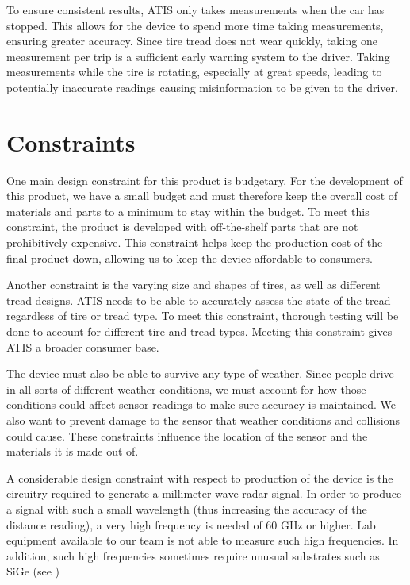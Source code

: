 \documentclass[11pt]{IEEEtran}
\begin{document}
			To ensure consistent results, ATIS only takes measurements when the car has stopped. This allows for the device to spend more time taking measurements, ensuring greater accuracy. Since tire tread does not wear quickly, taking one measurement per trip is a sufficient early warning system to the driver. Taking measurements while the tire is rotating, especially at great speeds, leading to potentially inaccurate readings causing misinformation to be given to the driver.


	\section{Constraints}
		One main design constraint for this product is budgetary. For the development of this product, we have a small budget and must therefore keep the overall cost of materials and parts to a minimum to stay within the budget. To meet this constraint, the product is developed with off-the-shelf parts that are not prohibitively expensive. This constraint helps keep the production cost of the final product down, allowing us to keep the device affordable to consumers. 

		Another constraint is the varying size and shapes of tires, as well as different tread designs. ATIS needs to be able to accurately assess the state of the tread regardless of tire or tread type. To meet this constraint, thorough testing will be done to account for different tire and tread types. Meeting this constraint gives ATIS a broader consumer base.

		The device must also be able to survive any type of weather. Since people drive in all sorts of different weather conditions, we must account for how those conditions could affect sensor readings to make sure accuracy is maintained. We also want to prevent damage to the sensor that weather conditions and collisions could cause. These constraints influence the location of the sensor and the materials it is made out of.

		A considerable design constraint with respect to production of the device is the circuitry required to generate a millimeter-wave radar signal. In order to produce a signal with such a small wavelength (thus increasing the accuracy of the distance reading), a very high frequency is needed of 60 GHz or higher. Lab equipment available to our team is not able to measure such high frequencies. In addition, such high frequencies sometimes require unusual substrates such as SiGe (see \cite{122ghz,240ghz})
\end{document}
